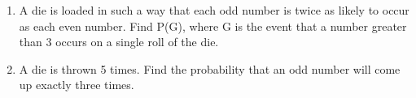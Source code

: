 \begin{enumerate}[label=\thesection.\arabic*,ref=\thesection.\theenumi]
	\item A die is loaded in such a way that each odd number is twice as likely to occur as
each even number. Find P(G), where G is the event that a number greater than
3 occurs on a single roll of the die.
		\solution
%		
\item A die is thrown 5 times. Find the probability that an odd number will come up exactly three times.
		\solution
	
\end{enumerate}
